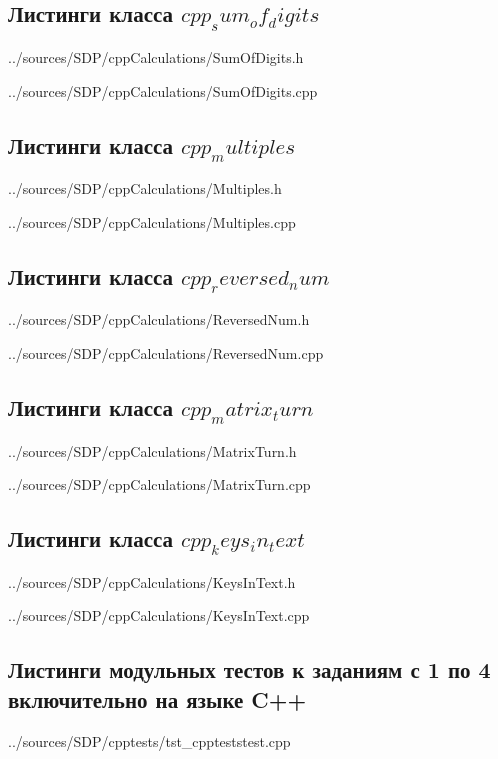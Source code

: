 \documentclass[12pt,a4paper]{report}
\begin{document}
\subsection*{Листинги класса $cpp_sum_of_digits$}

{../sources/SDP/cppCalculations/SumOfDigits.h}

{../sources/SDP/cppCalculations/SumOfDigits.cpp}
\newpage

\subsection*{Листинги класса $cpp_multiples$}

{../sources/SDP/cppCalculations/Multiples.h}

{../sources/SDP/cppCalculations/Multiples.cpp}

\newpage

\subsection*{Листинги класса $cpp_reversed_num$}

{../sources/SDP/cppCalculations/ReversedNum.h}

{../sources/SDP/cppCalculations/ReversedNum.cpp}
\newpage

\subsection*{Листинги класса $cpp_matrix_turn$}

{../sources/SDP/cppCalculations/MatrixTurn.h}

{../sources/SDP/cppCalculations/MatrixTurn.cpp}
\newpage

\subsection*{Листинги класса $cpp_keys_in_text$}

{../sources/SDP/cppCalculations/KeysInText.h}

{../sources/SDP/cppCalculations/KeysInText.cpp}
\newpage

\subsection*{Листинги модульных тестов к заданиям с 1 по 4 включительно на языке C++}

{../sources/SDP/cpptests/tst_cppteststest.cpp}
\newpage
\end{document}
